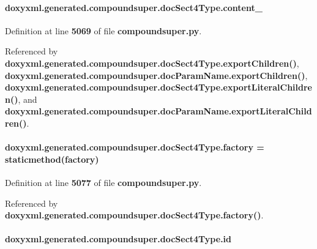 \paragraph[{content\+\_\+}]{\setlength{\rightskip}{0pt plus 5cm}doxyxml.\+generated.\+compoundsuper.\+doc\+Sect4\+Type.\+content\+\_\+}\label{classdoxyxml_1_1generated_1_1compoundsuper_1_1docSect4Type_a796f340743fdf45a205ca1210c1219a4}


Definition at line {\bf 5069} of file {\bf compoundsuper.\+py}.



Referenced by {\bf doxyxml.\+generated.\+compoundsuper.\+doc\+Sect4\+Type.\+export\+Children()}, {\bf doxyxml.\+generated.\+compoundsuper.\+doc\+Param\+Name.\+export\+Children()}, {\bf doxyxml.\+generated.\+compoundsuper.\+doc\+Sect4\+Type.\+export\+Literal\+Children()}, and {\bf doxyxml.\+generated.\+compoundsuper.\+doc\+Param\+Name.\+export\+Literal\+Children()}.

\paragraph[{factory}]{\setlength{\rightskip}{0pt plus 5cm}doxyxml.\+generated.\+compoundsuper.\+doc\+Sect4\+Type.\+factory = staticmethod(factory)\hspace{0.3cm}{\ttfamily [static]}}\label{classdoxyxml_1_1generated_1_1compoundsuper_1_1docSect4Type_ad6668c04b1cad60c0fa94b349a8a5600}


Definition at line {\bf 5077} of file {\bf compoundsuper.\+py}.



Referenced by {\bf doxyxml.\+generated.\+compoundsuper.\+doc\+Sect4\+Type.\+factory()}.

\paragraph[{id}]{\setlength{\rightskip}{0pt plus 5cm}doxyxml.\+generated.\+compoundsuper.\+doc\+Sect4\+Type.\+id}\label{classdoxyxml_1_1generated_1_1compoundsuper_1_1docSect4Type_a804fa491d99db2988f1697feaed4edd8}


